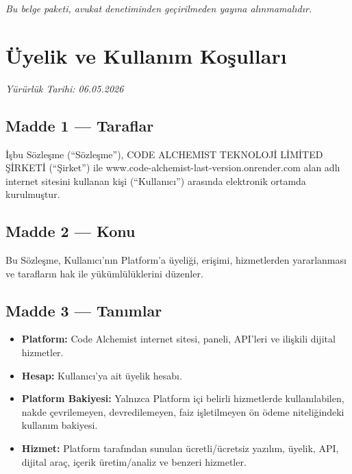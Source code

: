 \documentclass[12pt,a4paper]{article}
\begin{document}
\vspace{0.5em}
\textit{Bu belge paketi, avukat denetiminden ge\c{c}irilmeden yay{\i}na al{\i}nmamal{\i}d{\i}r.}

\section{\"{U}yelik ve Kullan{\i}m Ko\c{s}ullar{\i}}
\textit{Y\"{u}r\"{u}rl\"{u}k Tarihi: 06.05.2026}

\subsection*{Madde 1 --- Taraflar}
\.{I}\c{s}bu S\"{o}zle\c{s}me (``S\"{o}zle\c{s}me''), CODE ALCHEMIST TEKNOLOJ\.{I} L\.{I}M\.{I}TED \c{S}\.{I}RKET\.{I}
(``\c{S}irket'') ile www.code-alchemist-last-version.onrender.com alan adl{\i} internet sitesini
kullanan ki\c{s}i (``Kullan{\i}c{\i}'') aras{\i}nda elektronik ortamda kurulmu\c{s}tur.

\subsection*{Madde 2 --- Konu}
Bu S\"{o}zle\c{s}me, Kullan{\i}c{\i}'n{\i}n Platform'a \"{u}yeli\u{g}i, eri\c{s}imi, hizmetlerden yararlanmas{\i}
ve taraflar{\i}n hak ile y\"{u}k\"{u}ml\"{u}l\"{u}klerini d\"{u}zenler.

\subsection*{Madde 3 --- Tan{\i}mlar}
\begin{itemize}
  \item \textbf{Platform:} Code Alchemist internet sitesi, paneli, API'leri ve ili\c{s}kili dijital hizmetler.
  \item \textbf{Hesap:} Kullan{\i}c{\i}'ya ait \"{u}yelik hesab{\i}.
  \item \textbf{Platform Bakiyesi:} Yaln{\i}zca Platform i\c{c}i belirli hizmetlerde kullan{\i}labilen, nakde
        \c{c}evrilemeyen, devredilemeyen, faiz i\c{s}letilmeyen \"{o}n \"{o}deme niteli\u{g}indeki kullan{\i}m bakiyesi.
  \item \textbf{Hizmet:} Platform taraf{\i}ndan sunulan \"{u}cretli/\"{u}cretsiz yaz{\i}l{\i}m, \"{u}yelik, API,
        dijital ara\c{c}, i\c{c}erik \"{u}retim/analiz ve benzeri hizmetler.
\end{itemize}
\end{document}
